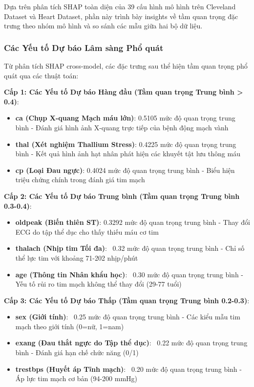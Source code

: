 Dựa trên phân tích SHAP toàn diện của 39 cấu hình mô hình trên Cleveland Dataset và Heart Dataset, phần này trình bày insights về tầm quan trọng đặc trưng theo nhóm mô hình và so sánh các mẫu giữa hai bộ dữ liệu.

\subsubsection{Các Yếu tố Dự báo Lâm sàng Phổ quát}

Từ phân tích SHAP cross-model, các đặc trưng sau thể hiện tầm quan trọng phổ quát qua các thuật toán:

\textbf{Cấp 1: Các Yếu tố Dự báo Hàng đầu (Tầm quan trọng Trung bình > 0.4)}:
\begin{itemize}
    \item \textbf{ca (Chụp X-quang Mạch máu lớn)}: 0.5105 mức độ quan trọng trung bình - Đánh giá hình ảnh X-quang trực tiếp của bệnh động mạch vành
    \item \textbf{thal (Xét nghiệm Thallium Stress)}: 0.4225 mức độ quan trọng trung bình - Kết quả hình ảnh hạt nhân phát hiện các khuyết tật lưu thông máu  
    \item \textbf{cp (Loại Đau ngực)}: 0.4024 mức độ quan trọng trung bình - Biểu hiện triệu chứng chính trong đánh giá tim mạch
\end{itemize}

\textbf{Cấp 2: Các Yếu tố Dự báo Trung bình (Tầm quan trọng Trung bình 0.3-0.4)}:
\begin{itemize}
    \item \textbf{oldpeak (Biến thiên ST)}: 0.3292 mức độ quan trọng trung bình - Thay đổi ECG do tập thể dục cho thấy thiếu máu cơ tim
    \item \textbf{thalach (Nhịp tim Tối đa)}: ~0.32 mức độ quan trọng trung bình - Chỉ số thể lực tim với khoảng 71-202 nhịp/phút
    \item \textbf{age (Thông tin Nhân khẩu học)}: ~0.30 mức độ quan trọng trung bình - Yếu tố rủi ro tim mạch không thể thay đổi (29-77 tuổi)
\end{itemize}

\textbf{Cấp 3: Các Yếu tố Dự báo Thấp (Tầm quan trọng Trung bình 0.2-0.3)}:
\begin{itemize}
    \item \textbf{sex (Giới tính)}: ~0.25 mức độ quan trọng trung bình - Các kiểu mẫu tim mạch theo giới tính (0=nữ, 1=nam)
    \item \textbf{exang (Đau thắt ngực do Tập thể dục)}: ~0.22 mức độ quan trọng trung bình - Đánh giá hạn chế chức năng (0/1)
    \item \textbf{trestbps (Huyết áp Tĩnh mạch)}: ~0.20 mức độ quan trọng trung bình - Áp lực tim mạch cơ bản (94-200 mmHg)
\end{itemize}

